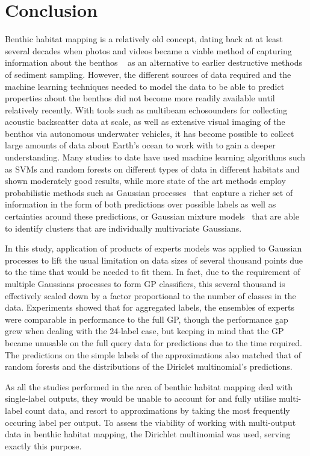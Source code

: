 \chapter{Conclusion} \label{chap:conclusion}

Benthic habitat mapping is a relatively old concept, dating back at at least several decades when photos and videos became a viable method of capturing information about the benthos ~\citep{gibson07} as an alternative to earlier destructive methods of sediment sampling. However, the different sources of data required and the machine learning techniques needed to model the data to be able to predict properties about the benthos did not become more readily available until relatively recently. With tools such as multibeam echosounders for collecting acoustic backscatter data at scale, as well as extensive visual imaging of the benthos via autonomous underwater vehicles, it has become possible to collect large amounts of data about Earth's ocean to work with to gain a deeper understanding. Many studies to date have used machine learning algorithms such as SVMs and random forests on different types of data in different habitats and shown moderately good results, while more state of the art methods employ probabilistic methods such as Gaussian processes~\citep{bender12} that capture a richer set of information in the form of both predictions over possible labels as well as certainties around these predictions, or Gaussian mixture models~\citep{ahsan11} that are able to identify clusters that are individually multivariate Gaussians.

In this study, application of products of experts models was applied to Gaussian processes to lift the usual limitation on data sizes of several thousand points due to the time that would be needed to fit them. In fact, due to the requirement of multiple Gaussians processes to form GP classifiers, this several thousand is effectively scaled down by a factor proportional to the number of classes in the data. Experiments showed that for aggregated labels, the ensembles of experts were comparable in performance to the full GP, though the performance gap grew when dealing with the 24-label case, but keeping in mind that the GP became unusable on the full query data for predictions due to the time required. The predictions on the simple labels of the approximations also matched that of random forests and the distributions of the Diriclet multinomial's predictions.

As all the studies performed in the area of benthic habitat mapping deal with single-label outputs, they would be unable to account for and fully utilise multi-label count data, and resort to approximations by taking the most frequently occuring label per output. To assess the viability of working with multi-output data in benthic habitat mapping, the Dirichlet multinomial was used, serving exactly this purpose. 

